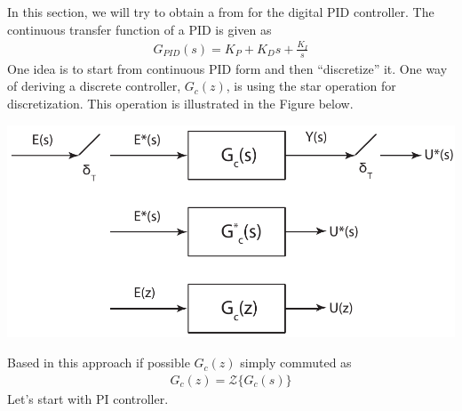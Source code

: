 \documentclass[twoside]{article}
\begin{document}
In this section, we will try to obtain a from for the digital PID
controller. The continuous transfer function of a PID is given as
%
\begin{align*}
G_{PID}(s) = K_P + K_D s + \frac{K_I}{s}
\end{align*}
% 
One idea is to start from continuous PID form and then ``discretize''
it. One way of deriving a discrete controller, $G_{c}(z)$, is using
the star operation for discretization. This operation is illustrated 
in the Figure below.
%
    \begin{center}
\begin{minipage}[h]{0.6\linewidth}
    \begin{center}
      \includegraphics[width=\textwidth]{discrete_controller}
    \end{center}
\end{minipage}
    \end{center}
%
Based in this approach if possible $G_c(z)$ simply commuted as
%
\begin{align*}
  G_c(z) = \mathcal{Z} \lbrace G_c(s) \rbrace
\end{align*}
%
Let's start with PI controller. 
\end{document}
